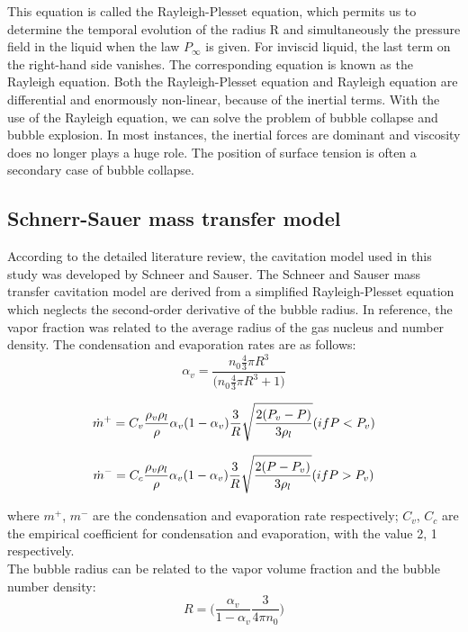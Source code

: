 This equation is called the Rayleigh-Plesset equation, which permits
us to determine the temporal evolution of the radius R and
simultaneously the pressure field in the liquid when the law
$P_{\infty}$ is given. For inviscid liquid, the last term on the
right-hand side vanishes. The corresponding equation is known as the
Rayleigh equation.  Both the Rayleigh-Plesset equation and Rayleigh
equation are differential and enormously non-linear, because of the
inertial terms. With the use of the Rayleigh equation, we can solve
the problem of bubble collapse and bubble explosion.  In most
instances, the inertial forces are dominant and viscosity does no
longer plays a huge role. The position of surface tension is often a
secondary case of bubble collapse.

\subsection{Schnerr-Sauer mass transfer model}
According to the detailed literature review, the cavitation model used
in this study was developed by Schneer and Sauser. The Schneer and
Sauser mass transfer cavitation model are derived from a simplified
Rayleigh-Plesset equation which neglects the second-order derivative
of the bubble radius. In reference\cite{Zhao2021, Hidalgo2014}, the
vapor fraction was related to the average radius of the gas nucleus
and number density.  The condensation and evaporation rates are as
follows:
\begin{equation}
{{\alpha}_v}=\frac{{{n}_0}{\frac{4}{3}}\pi{{R}^3}}{\Bigg({n_0}{\frac{4}{3}}\pi{R^3}+1 \Bigg)}
\end{equation}

\begin{equation}
{{\dot m}^+}={C_v}{\frac{{{\rho}_v}{\rho}_l}{\rho}}{{\alpha}_v}{(1-{\alpha}_v)}{\frac{3}{R}}{\sqrt{\frac{2({P_v}-{P})}{3{\rho}_l}}} \\     
({if P<P_v})
\end{equation}

\begin{equation}
 {{\dot{m}}^-}={C_c}{\frac{{{\rho}_v}{\rho}_l}{\rho}}{{\alpha}_v}{(1-{\alpha}_v)}{\frac{3}{R}}{\sqrt{\frac{2({P}-{P_v})}{3{\rho}_l}}}
 \\ ({if P>P_v})
\end{equation}

where ${m}^+$, ${m}^-$ are the condensation and evaporation rate
respectively; $C_v$, $C_c$ are the empirical coefficient for
condensation and evaporation, with the value 2, 1 respectively.\\ The
bubble radius can be related to the vapor volume fraction and the
bubble number density:
\begin{equation}
 R=\Bigg({\frac{{{\alpha}_v}}{1-{{\alpha}_v}}}{\frac{3}{4{\pi}{n_0}}}\Bigg)
\end{equation}

